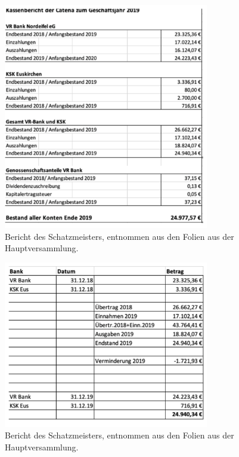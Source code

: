 \documentclass[a4paper, 11pt]{article}
\begin{document}
\begin{figure}
    \centering
    \includegraphics[width=0.8\textwidth]{kasse1.PNG}
    \caption{Bericht des Schatzmeisters, entnommen aus den Folien aus der Hauptversammlung.}
    \label{fig:kasse1}
\end{figure}

\begin{figure}
    \centering
    \includegraphics[width=0.8\textwidth]{kasse2.PNG}
    \caption{Bericht des Schatzmeisters, entnommen aus den Folien aus der Hauptversammlung.}
    \label{fig:kasse2}
\end{figure}
\end{document}
